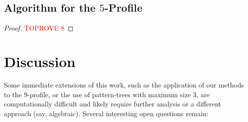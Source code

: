\documentclass{article}
\theoremstyle{remark}
\theoremstyle{plain}
\begin{document}
\subsection{Algorithm for the \texorpdfstring{$5$}{5}-Profile}

\begin{proof}\textcolor{red}{TOPROVE 8}\end{proof}
    
\pagebreak
 \section{Discussion}
Some immediate extensions of this work, such as the application of our methods to the $9$-profile,
or the use of pattern-trees with maximum size $3$,
are computationally difficult and likely require further analysis or a different approach (say, algebraic).
Several interesting open questions remain:
\end{document}
